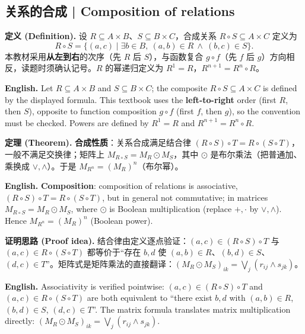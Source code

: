 \documentclass[UTF8,11pt,a4paper]{ctexart}
\newcommand{\EN}[1]{\par\noindent \textbf{English.} #1\par}
\newcommand{\DEF}[2]{\par\noindent\textbf{定义 (Definition).} #1\par\EN{#2}}
\newcommand{\THM}[2]{\par\noindent\textbf{定理 (Theorem).} #1\par\EN{#2}}
\newcommand{\PRF}[2]{\par\noindent\textbf{证明思路 (Proof idea).} #1\par\EN{#2}}
\begin{document}
\subsection{关系的合成 | Composition of relations}
\DEF{设 $R\subseteq A\times B$、$S\subseteq B\times C$，合成关系 $R\circ S\subseteq A\times C$ 定义为
\[
R\circ S=\{(a,c)\mid \exists b\in B,\ (a,b)\in R\ \wedge\ (b,c)\in S\}.
\]
本教材采用\textbf{从左到右}的次序（先 $R$ 后 $S$），与函数复合 $g\circ f$（先 $f$ 后 $g$）方向相反，读题时须确认记号。$R$ 的幂递归定义为 $R^1=R$，$R^{n+1}=R^n\circ R$。}{Let $R\subseteq A\times B$ and $S\subseteq B\times C$; the composite $R\circ S\subseteq A\times C$ is defined by the displayed formula. This textbook uses the \textbf{left-to-right} order (first $R$, then $S$), opposite to function composition $g\circ f$ (first $f$, then $g$), so the convention must be checked. Powers are defined by $R^1=R$ and $R^{n+1}=R^n\circ R$.}
\THM{\textbf{合成性质}：关系合成满足结合律 $(R\circ S)\circ T=R\circ(S\circ T)$，一般不满足交换律；矩阵上 $M_{R\circ S}=M_R\odot M_S$，其中 $\odot$ 是布尔乘法（把普通加、乘换成 $\vee,\wedge$）。于是 $M_{R^n}=(M_R)^n$（布尔幂）。}{\textbf{Composition}: composition of relations is associative, $(R\circ S)\circ T=R\circ(S\circ T)$, but in general not commutative; in matrices $M_{R\circ S}=M_R\odot M_S$, where $\odot$ is Boolean multiplication (replace $+,\cdot$ by $\vee,\wedge$). Hence $M_{R^n}=(M_R)^n$ (Boolean power).}
\PRF{结合律由定义逐点验证：$(a,c)\in(R\circ S)\circ T$ 与 $(a,c)\in R\circ(S\circ T)$ 都等价于“存在 $b,d$ 使 $(a,b)\in R$、$(b,d)\in S$、$(d,c)\in T$”。矩阵式是矩阵乘法的直接翻译：$(M_R\odot M_S)_{ik}=\bigvee_j(r_{ij}\wedge s_{jk})$。}{Associativity is verified pointwise: $(a,c)\in(R\circ S)\circ T$ and $(a,c)\in R\circ(S\circ T)$ are both equivalent to ``there exist $b,d$ with $(a,b)\in R$, $(b,d)\in S$, $(d,c)\in T$''. The matrix formula translates matrix multiplication directly: $(M_R\odot M_S)_{ik}=\bigvee_j(r_{ij}\wedge s_{jk})$.}
\end{document}
